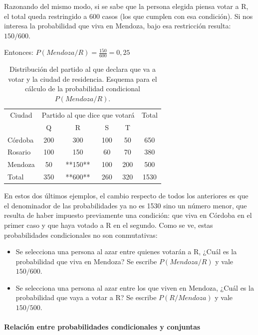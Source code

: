 \documentclass[]{article}
\let\oldparagraph\paragraph
\renewcommand{\paragraph}[1]{\oldparagraph{#1}\mbox{}}
\begin{document}
Razonando del mismo modo, si se sabe que la persona elegida piensa votar
a R, el total queda restringido a 600 casos (los que cumplen con esa
condición). Si nos interesa la probabilidad que viva en Mendoza, bajo
esa restricción resulta: \(150/600\).

Entonces: \(P(Mendoza/R) = \frac{150}{600} = 0,25\)

\begin{table}

\caption{\label{tab:unnamed-chunk-23}Distribución del partido al que declara que va a votar y la ciudad de residencia. Esquema para el cálculo de la probabilidad condicional $P(Mendoza/R)$.}
\centering
\begin{tabular}[t]{lccccc}
\toprule
\multicolumn{1}{c}{Ciudad} & \multicolumn{4}{c}{Partido al que dice que votará} & \multicolumn{1}{c}{Total} \\
\cmidrule(l{3pt}r{3pt}){1-1} \cmidrule(l{3pt}r{3pt}){2-5} \cmidrule(l{3pt}r{3pt}){6-6}
 & Q & R & S & T & \\
\midrule
\rowcolor{gray!6}  Córdoba & 200 & 300 & 100 & 50 & 650\\
Rosario & 100 & 150 & 60 & 70 & 380\\
\rowcolor{gray!6}  Mendoza & 50 & **150** & 100 & 200 & 500\\
Total & 350 & **600** & 260 & 320 & 1530\\
\bottomrule
\end{tabular}
\end{table}

En estos dos últimos ejemplos, el cambio respecto de todos los
anteriores es que el denominador de las probabilidades ya no es 1530
sino un número menor, que resulta de haber impuesto previamente una
condición: que viva en Córdoba en el primer caso y que haya votado a R
en el segundo. Como se ve, estas probabilidades condicionales no son
conmutativas:

\begin{itemize}
\item
  Se selecciona una persona al azar entre quienes votarán a R, ¿Cuál es
  la probabilidad que viva en Mendoza? Se escribe \(P(Mendoza/R)\) y
  vale \(150/600\).
\item
  Se selecciona una persona al azar entre los que viven en Mendoza,
  ¿Cuál es la probabilidad que vaya a votar a R? Se escribe
  \(P(R/Mendoza)\) y vale \(150/500\).
\end{itemize}

\hypertarget{relaciuxf3n-entre-probabilidades-condicionales-y-conjuntas}{%
\paragraph{Relación entre probabilidades condicionales y
conjuntas}\label{relaciuxf3n-entre-probabilidades-condicionales-y-conjuntas}}
\end{document}
